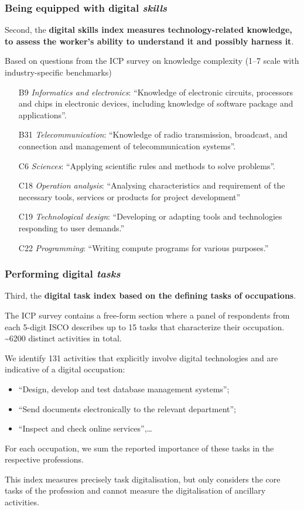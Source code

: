 \documentclass[10pt,xcolor={usenames,dvipsnames}]{beamer}
\begin{document}
\begin{frame}
\frametitle{Being equipped with digital \textit{skills}}
Second, the \textbf{digital skills index measures technology-related knowledge, to assess the worker's ability to understand it and possibly harness it}.
\medskip

Based on questions from the ICP survey on knowledge complexity (1--7 scale with industry-specific benchmarks)
\begin{itemize}
\item[B9] \textit{Informatics and electronics}: “Knowledge of electronic circuits, processors and chips in electronic devices, including knowledge of software package and applications”.
\item[B31] \textit{Telecommunication}: “Knowledge of radio transmission, broadcast, and connection and management of telecommunication systems”.
\item[C6] \textit{Sciences}: “Applying scientific rules and methods to solve problems”.
\item[C18] \textit{Operation analysis}: “Analysing characteristics and requirement of the necessary tools, services or products for project development”
\item[C19] \textit{Technological design}: “Developing or adapting tools and technologies responding to user demands.”
\item[C22] \textit{Programming}: “Writing compute programs for various purposes.”
\end{itemize}
\end{frame}

\begin{frame}
\frametitle{Performing digital \textit{tasks}}
Third, the \textbf{digital task index based on the defining tasks of occupations}.
\medskip

The ICP survey contains a free-form section where a panel of respondents from each 5-digit ISCO describes up to 15 tasks that characterize their occupation. \textasciitilde6200 distinct activities in total.

We identify 131 activities that explicitly involve digital technologies and are indicative of a digital occupation:\\
\begin{itemize}
    \item “Design, develop and test database management systems”; 
    \item “Send documents electronically to the relevant department”;
    \item “Inspect and check online services”,\ldots
\end{itemize}
\medskip

For each occupation, we sum the reported importance of these tasks in the respective professions.
\medskip

This index measures precisely task digitalisation, but only considers the core tasks of the profession and cannot measure the digitalisation of ancillary activities.
\end{frame}
\end{document}

